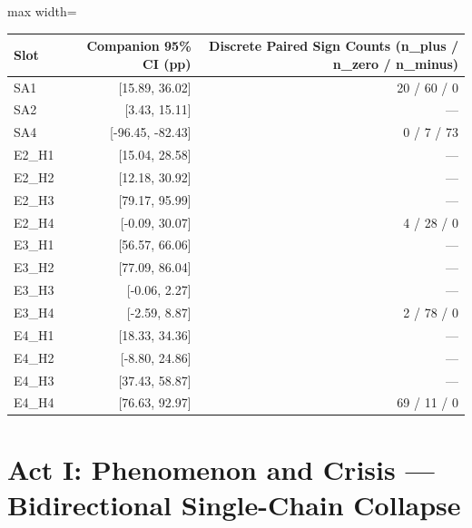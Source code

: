 \documentclass[11pt,a4paper]{article}
\begin{document}
\begin{center}\begingroup\small\setlength{\tabcolsep}{4.5pt}\renewcommand{\arraystretch}{1.12}\begin{adjustbox}{max width=\textwidth}\begin{tabular}{lrr}\toprule
\textbf{Slot} & \textbf{Companion 95\% CI (pp)} & \textbf{Discrete Paired Sign Counts (n\_\allowbreak{}plus / n\_\allowbreak{}zero / n\_\allowbreak{}minus)} \\ \midrule
SA1 & [15.89, 36.02] & 20 / 60 / 0 \\
SA2 & [3.43, 15.11] & --- \\
SA4 & [-96.45, -82.43] & 0 / 7 / 73 \\
E2\_\allowbreak{}H1 & [15.04, 28.58] & --- \\
E2\_\allowbreak{}H2 & [12.18, 30.92] & --- \\
E2\_\allowbreak{}H3 & [79.17, 95.99] & --- \\
E2\_\allowbreak{}H4 & [-0.09, 30.07] & 4 / 28 / 0 \\
E3\_\allowbreak{}H1 & [56.57, 66.06] & --- \\
E3\_\allowbreak{}H2 & [77.09, 86.04] & --- \\
E3\_\allowbreak{}H3 & [-0.06, 2.27] & --- \\
E3\_\allowbreak{}H4 & [-2.59, 8.87] & 2 / 78 / 0 \\
E4\_\allowbreak{}H1 & [18.33, 34.36] & --- \\
E4\_\allowbreak{}H2 & [-8.80, 24.86] & --- \\
E4\_\allowbreak{}H3 & [37.43, 58.87] & --- \\
E4\_\allowbreak{}H4 & [76.63, 92.97] & 69 / 11 / 0 \\
\bottomrule\end{tabular}\end{adjustbox}\endgroup\end{center}


\section{Act I: Phenomenon and Crisis --- Bidirectional Single-Chain Collapse}
\end{document}
